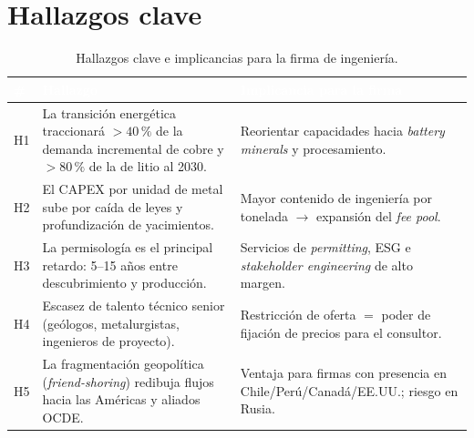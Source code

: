 \documentclass[11pt,letterpaper]{report}
\begin{document}
\section{Hallazgos clave}
\begin{table}[htbp]
\centering
\caption{Hallazgos clave e implicancias para la firma de ingeniería.}
\label{tab:hallazgos}
\footnotesize
\renewcommand{\arraystretch}{1.3}
\begin{tabularx}{\textwidth}{@{}p{0.8cm} X X@{}}
\toprule
\rowcolor{tablehead}\textcolor{white}{\textbf{\#}} & \textcolor{white}{\textbf{Hallazgo}} & \textcolor{white}{\textbf{Implicancia para la firma}}\\
\midrule
H1 & La transición energética traccionará $>40\,\%$ de la demanda incremental de cobre y $>80\,\%$ de la de litio al 2030. & Reorientar capacidades hacia \emph{battery minerals} y procesamiento. \\
\rowcolor{tablealt} H2 & El CAPEX por unidad de metal sube por caída de leyes y profundización de yacimientos. & Mayor contenido de ingeniería por tonelada $\rightarrow$ expansión del \emph{fee pool}. \\
H3 & La permisología es el principal retardo: 5--15 años entre descubrimiento y producción. & Servicios de \emph{permitting}, ESG e \emph{stakeholder engineering} de alto margen. \\
\rowcolor{tablealt} H4 & Escasez de talento técnico senior (geólogos, metalurgistas, ingenieros de proyecto). & Restricción de oferta $=$ poder de fijación de precios para el consultor. \\
H5 & La fragmentación geopolítica (\emph{friend-shoring}) redibuja flujos hacia las Américas y aliados OCDE. & Ventaja para firmas con presencia en Chile/Perú/Canadá/EE.UU.; riesgo en Rusia. \\
\bottomrule
\end{tabularx}
\end{table}
\end{document}
